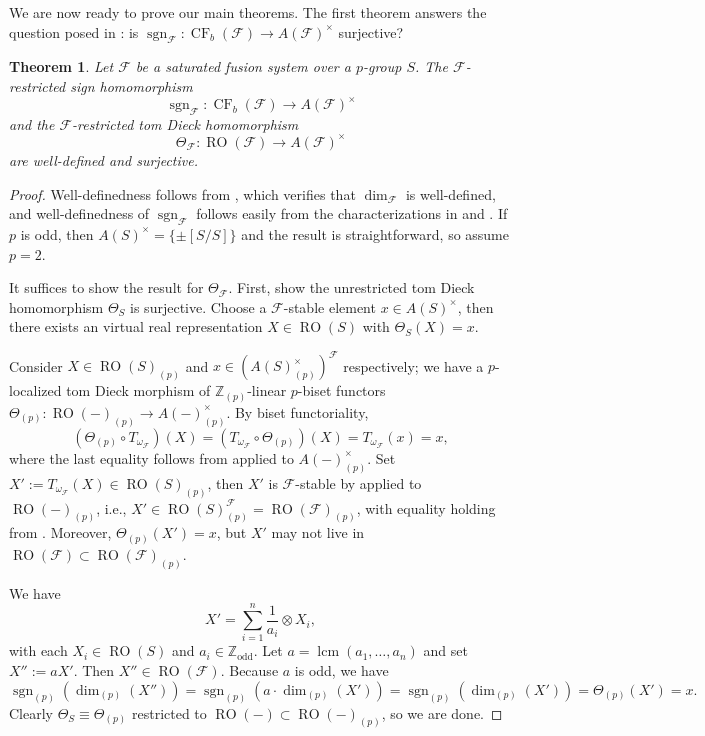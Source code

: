 \documentclass[]{amsart}
\newcommand{\on}[1]{\operatorname{#1}}
\newcommand{\calF}{\mathcal{F}}
\newcommand{\bbZ}{\mathbb{Z}}
\newcommand{\RO}{\on{RO}}
\newcommand{\CF}{\on{CF}}
\newcommand{\sgn}{\on{sgn}}
\newtheorem{theorem}{Theorem}[section]
\theoremstyle{remark}
\theoremstyle{definition}
\begin{document}
	We are now ready to prove our main theorems. The first theorem answers the question posed in \cite[Remark 4.2]{MM26}: is $\sgn_\calF\colon \CF_b(\calF) \to A(\calF)^\times$ surjective? 
	
	\begin{theorem}\label{thm:main}
		Let $\calF$ be a saturated fusion system over a $p$-group $S$. The $\calF$-restricted sign homomorphism \[\sgn_\calF\colon \CF_b(\calF) \to A(\calF)^\times\] and the $\calF$-restricted tom Dieck homomorphism \[\Theta_\calF\colon \RO(\calF) \to A(\calF)^\times\] are well-defined and surjective.
	\end{theorem}
	\begin{proof}
		Well-definedness follows from \cite[Lemma 4.5]{RY18}, which verifies that $\dim_\calF$ is well-defined, and well-definedness of $\sgn_\calF$ follows easily from the characterizations in  and . If $p$ is odd, then $A(S)^\times = \{\pm[S/S]\}$ and the result is straightforward, so assume $p = 2$. 
		
		It suffices to show the result for $\Theta_\calF$. First, \cite{Tor84,Y05} show the unrestricted tom Dieck homomorphism $\Theta_S$ is surjective. Choose a $\calF$-stable element $x \in A(S)^\times$, then there exists an virtual real representation $X \in \RO(S)$ with $\Theta_S(X) = x$. 
		
		Consider $X \in \RO(S)_{(p)}$ and $x \in (A(S)^\times_{(p)})^\calF$ respectively; we have a $p$-localized tom Dieck morphism of $\bbZ_{(p)}$-linear $p$-biset functors $\Theta_{(p)}\colon \RO(-)_{(p)} \to A(-)^\times_{(p)}$.  
		By biset functoriality, \[(\Theta_{(p)}\circ T_{\omega_\calF})(X) = (T_{\omega_\calF}\circ \Theta_{(p)})(X) = T_{\omega_\calF}(x) = x,\] where the last equality follows from  applied to $A(-)^\times_{(p)}$. Set $X' := T_{\omega_\calF}(X) \in \RO(S)_{(p)}$, then $X'$ is $\calF$-stable by  applied to $\RO(-)_{(p)}$, i.e., $X' \in \on{RO}(S)^\calF_{(p)} = \RO(\calF)_{(p)}$, with equality holding from . Moreover, $\Theta_{(p)}(X') = x$, but $X'$ may not live in $\RO(\calF) \subset \RO(\calF)_{(p)}$. 
		
		We have \[X' = \sum_{i = 1}^n\frac{1}{a_i}\otimes X_i,\] with each $X_i \in \RO(S)$ and $a_i \in \bbZ_{\on{odd}}$. Let $a = \on{lcm}(a_1,\dots, a_n)$ and set $X'' := a X'$. Then $X'' \in \RO(\calF)$. Because $a$ is odd, we have \[\sgn_{(p)}(\dim_{(p)}(X'')) = \sgn_{(p)}(a\cdot \dim_{(p)}(X')) = \sgn_{(p)}(\dim_{(p)}(X')) = \Theta_{(p)}(X') = x.\] Clearly $\Theta_S \equiv \Theta_{(p)}$ restricted to $\RO(-)\subset \RO(-)_{(p)}$, so we are done. 
	\end{proof}
	
\end{document}
